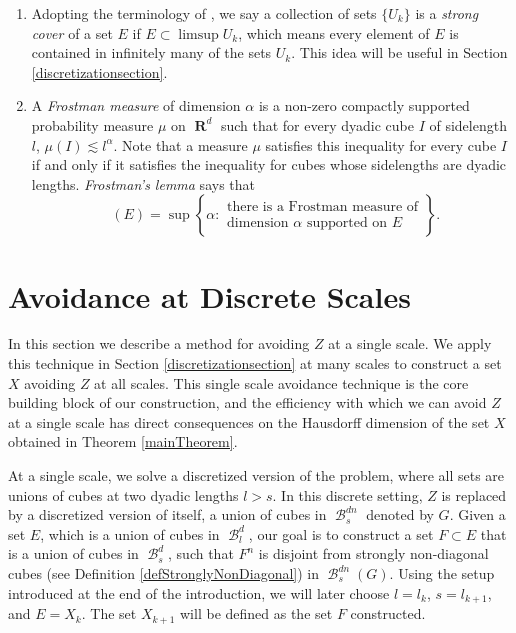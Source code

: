 \documentclass[dvipsnames,letterpaper,12pt]{article}
\numberwithin{equation}{section}
\theoremstyle{plain}
\theoremstyle{remark}
\DeclareMathOperator{\hausdim}{\dim_{\mathbf{H}}}
\DeclareMathOperator{\RR}{\mathbf{R}}
\DeclareMathOperator{\setcolon}{\colon}
\DeclareMathOperator{\B}{\mathcal{B}}
\begin{document}
\begin{enumerate}
	\item\label{defStrongCover} Adopting the terminology of \cite{KatzTao}, we say a collection of sets $\{ U_k \}$ is a {\it strong cover} of a set $E$ if $E \subset \limsup U_k$, which means every element of $E$ is contained in infinitely many of the sets $U_k$. This idea will be useful in Section \ref{discretizationsection}.  

	\item\label{defFrostmanItem} A {\it Frostman measure} of dimension $\alpha$ is a non-zero compactly supported probability measure $\mu$ on $\RR^d$ such that for every dyadic cube $I$ of sidelength $l$, $\mu(I) \lesssim l^\alpha$. Note that a measure $\mu$ satisfies this inequality for every cube $I$ if and only if it satisfies the inequality for cubes whose sidelengths are dyadic lengths. {\it Frostman's lemma} says that
	\[ \hausdim(E) = \sup \left\{ \alpha \setcolon
		\begin{array}{c}
			\text{there is a Frostman measure of}\\
			\text{dimension $\alpha$ supported on $E$}
		\end{array} \right\}. \]
\end{enumerate}









\section{Avoidance at Discrete Scales}\label{discretesection}

In this section we describe a method for avoiding $Z$ at a single scale. We apply this technique in Section \ref{discretizationsection} at many scales to construct a set $X$ avoiding $Z$ at all scales. This single scale avoidance technique is the core building block of our construction, and the efficiency with which we can avoid $Z$ at a single scale has direct consequences on the Hausdorff dimension of the set $X$ obtained in Theorem \ref{mainTheorem}.

At a single scale, we solve a discretized version of the problem, where all sets are unions of cubes at two dyadic lengths $l > s$. In this discrete setting, $Z$ is replaced by a discretized version of itself, a union of cubes in $\B^{dn}_s$ denoted by $G$. Given a set $E$, which is a union of cubes in $\B_l^d$, our goal is to construct a set $F \subset E$ that is a union of cubes in $\B_s^d$, such that $F^n$ is disjoint from strongly non-diagonal cubes (see Definition \ref{defStronglyNonDiagonal}) in $\B^{dn}_s(G)$. Using the setup introduced at the end of the introduction, we will later choose $l = l_k$, $s = l_{k+1}$, and $E = X_k$. The set $X_{k+1}$ will be defined as the set $F$ constructed.
\end{document}
